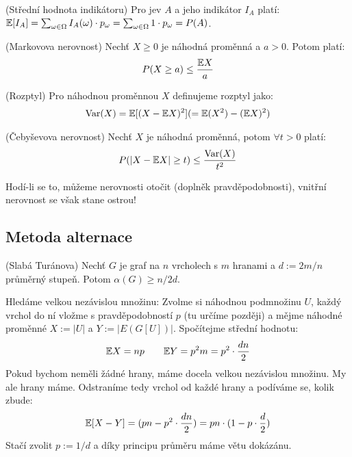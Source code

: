 \poz (Střední hodnota indikátoru) Pro jev $A$ a jeho indikátor $I_A$ platí:
$\mathbb{E}[I_A] = \sum_{\omega \in \Omega} I_A(\omega) \cdot p_\omega = \sum_{\omega
\in \Omega} 1 \cdot p_\omega = P(A)$.

\vt (Markovova nerovnost) Nechť $X \geq 0$ je náhodná proměnná a $a > 0$. Potom
platí:
\begin{align}
	P(X \geq a) \leq {\mathbb{E}X \over a}
\end{align}

\df (Rozptyl) Pro náhodnou proměnnou $X$ definujeme rozptyl jako:
\begin{align}
	\operatorname{Var}(X) = \mathbb{E}[(X - \mathbb{E} X)^2] ( = \mathbb{E}(X^2) - (\mathbb{E} X)^2 )
\end{align}

\vt (Čebyševova nerovnost) Nechť $X$ je náhodná proměnná, potom $\forall t > 0$
platí:
\begin{align}
	P(|X - \mathbb{E} X| \geq t) \leq {\operatorname{Var}(X) \over t^2}
\end{align}

\pzn Hodí-li se to, můžeme nerovnosti otočit (doplněk pravděpodobnosti), vnitřní
nerovnost se však stane ostrou!



\subsection{Metoda alternace}

\vt (Slabá Turánova) Nechť $G$ je graf na $n$ vrcholech s $m$ hranami a $d :=
2m/n$ průměrný stupeň. Potom $\alpha(G) \geq n/2d$.

\dk Hledáme velkou nezávislou množinu: Zvolme si náhodnou podmnožinu $U$, každý
vrchol do ní vložme s pravděpodobností $p$ (tu určíme později) a mějme náhodné
proměnné $X := |U|$ a $Y := |E(G[U])|$. Spočítejme střední hodnotu:
\begin{align}
	\mathbb{E} X = np \qquad \mathbb{E} Y = p^2 m = p^2 \cdot {dn \over 2 }
\end{align}
Pokud bychom neměli žádné hrany, máme docela velkou nezávislou množinu. My ale
hrany máme. Odstraníme tedy vrchol od každé hrany a podíváme se, kolik zbude:
\begin{align}
	\mathbb{E}[X - Y] = (pn - p^2 \cdot {dn \over 2}) = pn \cdot (1-p \cdot {d \over 2})
\end{align}
Stačí zvolit $ p := 1/d$ a díky principu průměru máme větu dokázánu.

